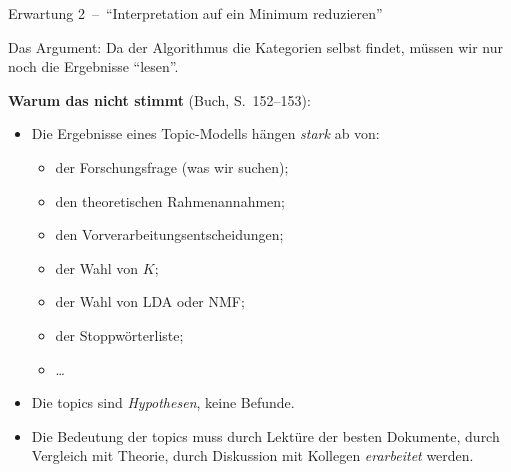 \documentclass[aspectratio=169,11pt]{beamer}
\newcommand{\mdash}{\,{\monodash–}\,}
\let\oldemph\emph
\renewcommand{\emph}[1]{{\color{solCyan}\oldemph{#1}}}
\let\oldtextbf\textbf
\renewcommand{\textbf}[1]{{\color{solBase3}\oldtextbf{#1}}}
\begin{document}
\begin{frame}{Erwartung 2 \mdash{} \enquote{Interpretation auf ein Minimum reduzieren}}

  Das Argument: Da der Algorithmus die Kategorien selbst findet,
  müssen wir nur noch die Ergebnisse \enquote{lesen}.

  \vfill
  \textbf{Warum das nicht stimmt} (Buch, S.~152–153):
  \begin{itemize}
    \item Die Ergebnisse eines Topic-Modells hängen \emph{stark} ab von:
          \begin{itemize}
            \item der Forschungsfrage (was wir suchen);
            \item den theoretischen Rahmenannahmen;
            \item den Vorverarbeitungsentscheidungen;
            \item der Wahl von $K$;
            \item der Wahl von LDA oder NMF;
            \item der Stoppwörterliste;
            \item \dots
          \end{itemize}
    \vfill
    \item Die topics sind \emph{Hypothesen}, keine Befunde.
    \vfill
    \item Die Bedeutung der topics muss durch Lektüre der besten
          Dokumente, durch Vergleich mit Theorie, durch Diskussion
          mit Kollegen \emph{erarbeitet} werden.
  \end{itemize}

\end{frame}
\end{document}
